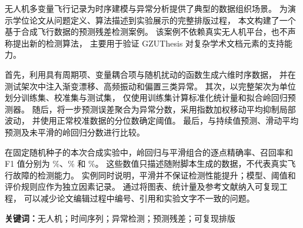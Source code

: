 无人机多变量飞行记录为时序建模与异常分析提供了典型的数据组织场景。
为演示学位论文从问题定义、算法描述到实验展示的完整排版过程，
本文构建了一个基于合成飞行数据的预测残差检测案例。
该案例不依赖真实无人机平台，也不声称提出新的检测算法，
主要用于验证 GZUThesis 对复杂学术文档元素的支持能力。

首先，利用具有周期项、变量耦合项与随机扰动的函数生成六维时序数据，
并在测试架次中注入渐变漂移、高频振动和偏置三类异常。
其次，以完整架次为单位划分训练集、校准集与测试集，
仅使用训练集计算标准化统计量和拟合岭回归预测器。
随后，将一步预测误差聚合为异常分数，采用指数加权移动平均抑制局部波动，
并使用正常校准数据的分位数确定阈值。
最后，与持续值预测、滑动平均预测及未平滑的岭回归分数进行比较。

在固定随机种子的本次合成实验中，岭回归与平滑组合的逐点精确率、召回率和
F1 值分别为 \DemoPrecision\%、\DemoRecall\% 和 \DemoFone\%。
这些数值只描述随附脚本生成的数据，不代表真实飞行故障的检测能力。
实例同时说明，平滑并不保证检测性能提升；模型、阈值和评价规则应作为独立因素记录。
通过将图表、统计量及参考文献纳入可复现工程，
可以减少论文编辑过程中编号、引用和实验文字不一致的问题。

\par\vspace{1em}
\noindent\textbf{关键词：}无人机；时间序列；异常检测；预测残差；可复现排版
